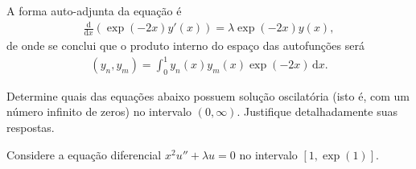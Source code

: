 \documentclass[a4paper,12pt, leqno, answers]{exam}
\begin{document}
\begin{questions}
\begin{solution}
        A forma auto-adjunta da equa\c{c}\~{a}o \'{e}
        \begin{align*}
            \frac{\mathrm{d}}{\mathrm{d}x}\left( \exp(-2x) y'(x) \right) = \lambda \exp(-2 x) y(x),
        \end{align*}
        de onde se conclui que o produto interno do espa\c{c}o das autofun\c{c}\~{o}es ser\'{a}
        \begin{align*}
            (y_n, y_m) = \int_0^1 y_n(x) y_m(x) \exp(-2x) \,\mathrm{d}x.
        \end{align*}
    \end{solution}

    \question[T4 de 2010] Determine quais das equa\c{c}\~{o}es abaixo possuem solu\c{c}\~{a}o oscilat\'{o}ria (isto \'{e}, com um n\'{u}mero infinito de zeros) no intervalo $(0, \infty)$. Justifique detalhadamente suas respostas.

    \question[T4 de 2010] Considere a equa\c{c}\~{a}o diferencial $x^2 u'' + \lambda u = 0$ no intervalo $[1, \exp(1)]$.
\end{questions}
\end{document}
